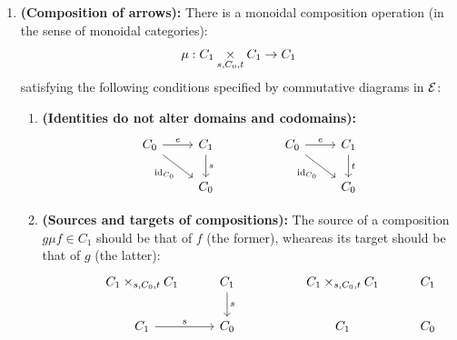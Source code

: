 \begin{definition}
\begin{enumerate}
\begin{enumerate}
                                        \item \textbf{(Composition of arrows):} There is a monoidal composition operation (in the sense of monoidal categories):
                                            $$\mu: C_1 \x_{s, C_0, t} C_1 \to C_1$$
                                        satisfying the following conditions specified by commutative diagrams in $\E$:
                                            \begin{enumerate}
                                                \item \textbf{(Identities do not alter domains and codomains):}
                                                    $$
                                                        \begin{tikzcd}
                                                        	{C_0} & {C_1} && {C_0} & {C_1} \\
                                                        	& {C_0} &&& {C_0}
                                                        	\arrow["e", from=1-1, to=1-2]
                                                        	\arrow["{\id_{C_0}}"', from=1-1, to=2-2]
                                                        	\arrow["s", from=1-2, to=2-2]
                                                        	\arrow["{\id_{C_0}}"', from=1-4, to=2-5]
                                                        	\arrow["t", from=1-5, to=2-5]
                                                        	\arrow["e", from=1-4, to=1-5]
                                                        \end{tikzcd}
                                                    $$
                                                \item \textbf{(Sources and targets of compositions):} The source of a composition $g \mu f \in C_1$ should be that of $f$ (the former), wheareas its target should be that of $g$ (the latter): 
                                                    $$
                                                        \begin{tikzcd}
                                                        	& {C_1 \x_{s, C_0, t} C_1} & {C_1} && {C_1 \x_{s, C_0, t} C_1} & {C_1} \\
                                                        	{} & {C_1} & {C_0} && {C_1} & {C_0}
                                                        	\arrow["s", from=1-3, to=2-3]
                                                        	\arrow["s", from=2-2, to=2-3]

\end{tikzcd}$$
\end{enumerate}
\end{enumerate}
\end{enumerate}
\end{definition}
